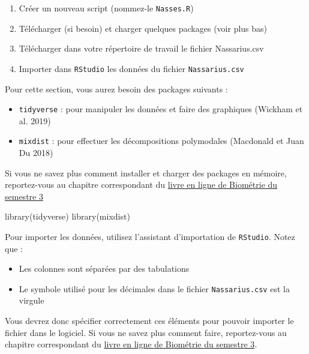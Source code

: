 \documentclass[
  a4paper,
  DIV=11,
  numbers=noendperiod,
  oneside]{scrreprt}
\newenvironment{Shaded}{}{}
\newcommand{\FunctionTok}[1]{\textcolor[rgb]{0.44,0.26,0.76}{#1}}
\newcommand{\NormalTok}[1]{\textcolor[rgb]{0.14,0.16,0.18}{#1}}
\providecommand{\tightlist}{%
  \setlength{\itemsep}{0pt}\setlength{\parskip}{0pt}}\usepackage{longtable,booktabs,array}
\begin{document}
\begin{enumerate}
\def\labelenumi{\arabic{enumi}.}
\tightlist
\item
  Créer un nouveau script (nommez-le \texttt{Nasses.R})
\item
  Télécharger (si besoin) et charger quelques packages (voir plus bas)
\item
  Télécharger dans votre répertoire de travail le fichier Nassarius.csv
\item
  Importer dans \texttt{RStudio} les données du fichier
  \texttt{Nassarius.csv}
\end{enumerate}

Pour cette section, vous aurez besoin des packages suivants :

\begin{itemize}
\tightlist
\item
  \texttt{tidyverse} : pour manipuler les données et faire des
  graphiques (Wickham et al. 2019)
\item
  \texttt{mixdist} : pour effectuer les décompositions polymodales
  (Macdonald et Juan Du 2018)
\end{itemize}

Si vous ne savez plus comment installer et charger des packages en
mémoire, reportez-vous au chapitre correspondant du
\href{https://besibo.github.io/BiometrieS3/01-R-basics.html\#sec-packages}{livre
en ligne de Biométrie du semestre 3}

\begin{Shaded}
\begin{Highlighting}[]
\FunctionTok{library}\NormalTok{(tidyverse)}
\FunctionTok{library}\NormalTok{(mixdist)}
\end{Highlighting}
\end{Shaded}

Pour importer les données, utilisez l'assistant d'importation de
\texttt{RStudio}. Notez que :

\begin{itemize}
\tightlist
\item
  Les colonnes sont séparées par des tabulations
\item
  Le symbole utilisé pour les décimales dans le fichier
  \texttt{Nassarius.csv} est la virgule
\end{itemize}

Vous devrez donc spécifier correctement ces éléments pour pouvoir
importer le fichier dans le logiciel. Si vous ne savez plus comment
faire, reportez-vous au chapitre correspondant du
\href{https://besibo.github.io/BiometrieS3/04-DataWrangling.html\#plaintext}{livre
en ligne de Biométrie du semestre 3}.
\end{document}
